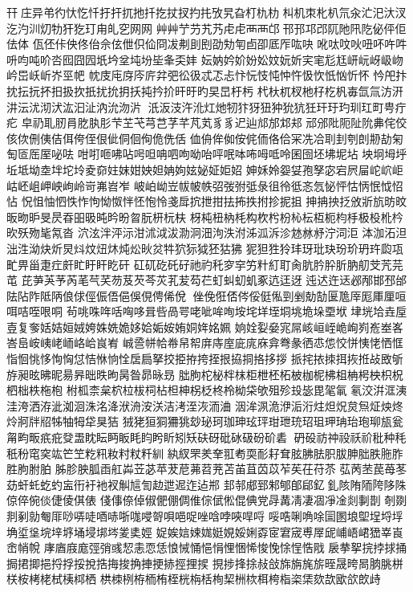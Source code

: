 幵庄异弚彴忕忔忏扜扞扤扡扦扢扙扠扚扥攷旯旮朾朹朸
朻机朿朼朳氘汆汒汜汏汊汔汋汌灱牞犴犵玎甪癿穵⽹网
⾋艸艼芀艽艿⾌虍⾑襾邙邗邘邛邔阢阤阠阣佖伻佢佉体
佤伾佧佒佟佁佘伭伳伿佡冏冹刜刞刡劭劮匉卣卲厎厏吰吷
吪呔呅吙吜吥吘吽呏呁吨吤呇囮囧囥坁坅坌坉坋坒夆奀妦
妘妠妗妎妢妐妏妧妡宎宒尨尪岍岏岈岋岉岒岊岆岓岕巠帊
帎庋庉庌庈庍弅弝彸彶忒忑忐忭忨忮忳忡忤忣忺忯忷忻怀
忴戺抃抌抎抏抔抇扱扻扺扰抁抈扷扽扲扴旰旴旳旲旵杅杇
杙杕杌杈杝杍杚杋毐氙氚汸汧汫沄沋沏汱汯汩沚汭沇沕沜
汦汳汥汻沎灴灺牣犿犽狃狆狁犺狅玕玗玓玔玒町甹疔疕
皁礽耴肕肙肐肒肜芐芏芅芎芑芓芊芃芄⾘豸迉辿邟邡邥邞
邧邠阰阨阯阭丳侘佼侅佽侀侇佶佴侉侄佷佌侗佪侚佹侁佸
侐侜侔侞侒侂侕佫佮冞冼冾刵刲刳剆刱劼匊匋匼厒厔咇呿
咁咑咂咈呫呺呾呥呬呴呦咍呯呡呠咘呣呧呤囷囹坯坲坭坫
坱坰坶垀坵坻坳坴坢坨坽夌奅妵妺姏姎妲姌姁妶妼姃姖妱
妽姀姈妴姇孢孥宓宕屄屇岮岤岠岵岯岨岬岟岣岭岢岪岧岝
岥岶岰岦帗帔帙弨弢弣弤彔徂彾彽忞忥怭怦怙怲怋怴怊怗
怳怚怞怬怢怍怐怮怓怑怌怉怜戔戽抭抴拑抾抪抶拊抮抳抯
抻抩抰抸攽斨斻昉旼昄昒昈旻昃昋昍昅旽昑昐曶朊枅杬枎
枒杶杻枘枆构杴枍枌杺枟枑枙枃杽极杸杹枔欥殀歾毞氝沓
泬泫泮泙沶泔沭泧沷泐泂沺泃泆泭泲泒泝沴沊沝沀泞泀洰
泍泇沰泹泏泩泑炔炘炅炓炆炄炑炖炂炚炃牪狖狋狘狉狜狒
狔狚狌狑玤玡玭玦玢玠玬玝瓝瓨甿畀甾疌疘皯盳盱盰盵矸
矼矹矻矺矷祂礿秅穸穻竻籵糽耵肏肮肣肸肵肭舠芠苀芫芚
芘芛芵芧芮芼芞芺芴芨芡芩苂芤苃芶芢虰虯虭虮豖迒迋迓
迍迖迕迗邲邴邯邳邰阹阽阼阺陃俍俅俓侲俉俋俁俔俜俙侻
侳俛俇俖侺俀侹俬剄剉勀勂匽卼厗厖厙厘咺咡咭咥哏哃
茍咷咮哖咶哅哆咠呰咼咢咾呲哞咰垵垞垟垤垌垗垝垛垔垘
垏垙垥垚垕壴复奓姡姞姮娀姱姝姺姽姼姶姤姲姷姛姩姳姵
姠姾姴姭宨屌峐峘峌峗峋峛峞峚峉峇峊峖峓峔峏峈峆峎峟
峸巹帡帢帣帠帤庰庤庢庛庣庥弇弮彖徆怷怹恔恲恞恅恓恇
恉恛恌恀恂恟怤恄恘恦恮扂扃拏挍挋拵挎挃拫拹挏挌拸拶
挀挓挔拺挕拻拰敁敃斪斿昶昡昲昵昜昦昢昳昫昺昝昴昹昮
朏朐柁柲柈枺柜枻柸柘柀枷柅柫柤柟枵柍枳柷柶柮柣柂枹
柎柧柰枲柼柆柭柌枮柦柛柺柉柊柃柪柋欨殂殄殶毖毘毠氠
氡洨洴洭洟洼洿洒洊泚洳洄洙洺洚洑洀洝浂洁洘洷洃洏浀
洇洠洬洈洢洉洐炷炟炾炱炰炡炴炵炩牁牉牊牬牰牳牮狊狤
狨狫狟狪狦狣玅珌珂珈珅玹玶玵玴珫玿珇玾珃珆玸珋瓬瓮
甮畇畈疧疪癹盄眈眃眄眅眊盷盻盺矧矨砆砑砒砅砐砏砎砉
砃砓祊祌祋祅祄秕种秏秖秎窀穾竑笀笁籺籸籹籿粀粁紃
紈紁罘羑羍羾耇耎耏耔耷胘胇胠胑胈胂胐胅胣胙胜胊胕胉
胏胗胦胍臿舡芔苙苾苹茇苨茀苕茺苫苖苴苬苡苲苵茌苻苶
苰苪苤苠苺苳苭虷虴虼虳衁衎衧衪衩觓訄訇赲迣迡迮迠郱
邽邿郕郅邾郇郋郈釔釓陔陏陑陓陊陎倞倅倇倓倢倰倛俵
俴倳倷倬俶俷倗倜倠倧倵倯倱倎党冔冓凊凄凅凈凎剡剚剒
剞剟剕剢勍匎厞唦哢唗唒哧哳哤唚哿唄唈哫唑唅哱唊哻哷
哸哠唎唃唋圁圂埌堲埕埒垺埆垽垼垸垶垿埇埐垹埁夎奊娙
娖娭娮娕娏娗娊娞娳孬宧宭宬尃屖屔峬峿峮峱峷崀峹帩帨
庨庮庪庬弳弰彧恝恚恧恁悢悈悀悒悁悝悃悕悛悗悇悜悎戙
扆拲挐捖挬捄捅挶捃揤挹捋捊挼挩捁挴捘捔捙挭捇挳捚捑
挸捗捀捈敊敆旆旃旄旂晊晟晇晑朒朓栟栚桉栲栳栻桋桏栖
栱栜栵栫栭栯桎桄栴栝栒栔栦栨栮桍栺栥栠欬欯欭欱欴歭
